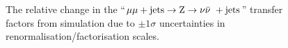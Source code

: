 \begin{figure}[!h]
{  } \\
   ~
  \caption{\label{fig:tfSyst_scale_mmZinv} The relative change in the
    ``$\mu\mu + \textrm{jets} \rightarrow {\text Z} \rightarrow \nu\bar{\nu}\ + \textrm{jets}$'' transfer factors from
    simulation due to $\pm1\sigma$ uncertainties in
    renormalisation/factorisation scales.  }
\end{figure}

